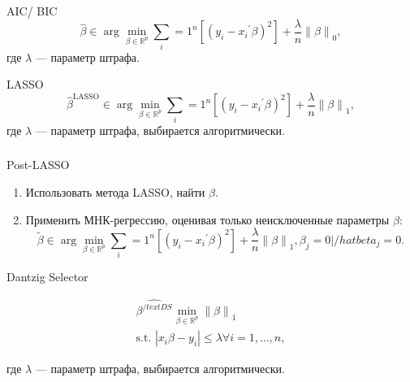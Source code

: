 \documentclass[c, dvipsnames]{beamer}  %
\begin{document}
\subsection{}



\begin{frame} 
\frametitle{\insertsection}  
\framesubtitle{\insertsubsection}
 	\begin{block}{AIC/ BIC}
  \begin{equation}
  \hat{\beta}  \in \arg \min_{\beta \in
\mathbb{R}^p} \sum_i=1^n \left[ (y_i - {x_i}^{'} \beta)^2 \right] +  \frac{\lambda}{n} \left\lVert \beta \right\rVert_0, 
\end{equation}
где $\lambda$ --- параметр штрафа.
 \end{block}

 \begin{block}{LASSO}
  \begin{equation}
  \hat{\beta}^{\text{LASSO}} \in \arg \min_{\beta \in
\mathbb{R}^p} \sum_i=1^n \left[ (y_i - {x_i}^{'} \beta)^2 \right] +  \frac{\lambda}{n} \left\lVert \beta \right\rVert_1,
\end{equation}
где $\lambda$ --- параметр штрафа, выбирается алгоритмически.
 \end{block}
 
\end{frame}

\begin{frame}
	\frametitle{\insertsection} 
\framesubtitle{\insertsubsection}

\begin{block}{Post-LASSO}
	\begin{enumerate}
		\item Использовать метода LASSO, найти $\hat{\beta}$.
		\item Применить МНК-регрессию, оценивая только неисключенные параметры $\beta$:
		\begin{equation}
		\tilde{\beta} \in \arg \min_{\beta \in
			\mathbb{R}^p} \sum_i=1^n \left[ (y_i - {x_i}^{'} \beta)^2 \right] +  \frac{\lambda}{n} \left\lVert \beta \right\rVert_1, \beta_j = 0| /hat{beta_j} = 0.
		\end{equation}
	\end{enumerate}
\end{block}


\begin{block}{Dantzig Selector}
	

\begin{eqnarray}
  \hat{\beta^{/text{DS}}} \min_{\beta \in
	\mathbb{R}^p} \left\lVert \beta \right\rVert_1\\
\text{s.t. } \left|x_i\beta - y_i\right| \leq \lambda \forall i = 1,\dots,n,
\end{eqnarray}

где $\lambda$ --- параметр штрафа, выбирается алгоритмически.

 \end{block}

\end{frame}
\end{document}
